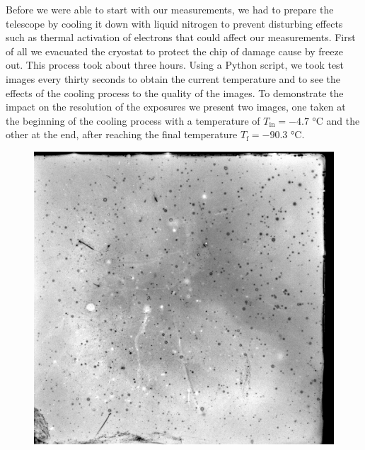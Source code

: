 Before we were able to start with our measurements, we had to prepare the telescope by cooling it down with liquid nitrogen to prevent disturbing effects such as thermal activation of electrons that could affect our measurements. First of all we evacuated the cryostat to protect the chip of damage cause by freeze out. This process took about three hours. Using a Python script, we took test images every thirty seconds to obtain the current temperature and to see the effects of the cooling process to the quality of the images. To demonstrate the impact on the resolution of the exposures we present two images, one taken at the beginning of the cooling process with a temperature of $T_{\text{in}} = -4.7$ °C  and the other at the end, after reaching the final temperature $T_{\text{f}} = -90.3$ °C.
\begin{figure}[H]
	\begin{minipage}{0.35\textwidth}
	\hspace{0.15\textwidth}
		\includegraphics[scale = 0.17]{figures/Exposures/cooling_start}
	\end{minipage}
	\hfill
	\begin{minipage}{0.35\textwidth}
		\hspace{-0.4\textwidth}

\end{minipage}
\end{figure}
